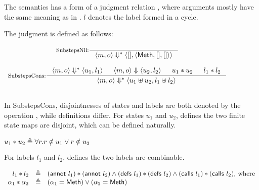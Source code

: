 The \Substeps{} semantics has a form of a judgment relation
, where arguments mostly have the same meaning as
in \Substep{}. $l$ denotes the label formed in a cycle.

\begin{definition}
  \label{def-semsss}
  The judgment  is defined as follows:
  \begin{center}
    \begin{math}
      \begin{array}{c}
        \inference[SubstepsNil:]{}
                  {\semsss{m}{o}{\emptymap}
                    {\semlbl{\alphameth}{\emptymap}{\emptymap}}} \\
        \mbox{} \\
        \inference[SubstepsCons:]{\semsss{m}{o}{u_1}{l_1} & \semsstepr{m}{o}{u_2}{l_2} & \sdisj{u_1}{u_2} & \ldisj{l_1}{l_2}}
                  {\semsss{m}{o}{\splus{u_1}{u_2}}{\lplus{l_1}{l_2}}} \\
        \mbox{} \\
      \end{array}
    \end{math}
  \end{center}
\end{definition}

In SubstepsCons, disjointnesses of states and labels are both denoted
by the operation \sdisj{}{}, while definitions differ. For states
$u_1$ and $u_2$,  defines the two finite state maps
are disjoint, which can be defined naturally.

\begin{definition}
  \label{def-sdisj}
  \mbox{}
  \begin{center}
    \begin{math}
      u_1 \ast u_2 \triangleq \forall r. r \notin u_1 \vee r \notin u_2
    \end{math}
  \end{center}
\end{definition}

For labels $l_1$ and $l_2$,  defines the two labels
are combinable.

\begin{definition}
  \label{def-ldisj}
  \mbox{}
  \begin{center}
    \begin{math}
      \begin{array}{rcl}
        l_1 \ast l_2 & \triangleq &
        (\textsf{annot}\ l_1) \ast (\textsf{annot}\ l_2) \wedge
        (\textsf{defs}\ l_1) \ast (\textsf{defs}\ l_2) \wedge
        (\textsf{calls}\ l_1) \ast (\textsf{calls}\ l_2) \textrm{, where} \\
        \alpha_1 \ast \alpha_2 & \triangleq &
        (\alpha_1 = \textsf{Meth}) \vee (\alpha_2 = \textsf{Meth}) \\
      \end{array}
    \end{math}
  \end{center}
\end{definition}


